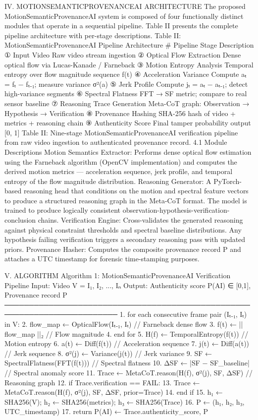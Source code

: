 IV.  MOTIONSEMANTICPROVENANCEAI ARCHITECTURE
The proposed MotionSemanticProvenanceAI system is composed of four functionally distinct modules that operate in a sequential pipeline. Table II presents the complete pipeline architecture with per-stage descriptions.
Table II: MotionSemanticProvenanceAI Pipeline Architecture
#	Pipeline Stage	Description
①	Input Video	Raw video stream ingestion
②	Optical Flow Extraction	Dense optical flow via Lucas-Kanade / Farneback
③	Motion Entropy Analysis	Temporal entropy over flow magnitude sequence f(t)
④	Acceleration Variance	Compute aₜ = fₜ − fₜ₋₁; measure variance σ²(a)
⑤	Jerk Profile	Compute jₜ = aₜ − aₜ₋₁; detect high-variance segments
⑥	Spectral Flatness	FFT → SF metric; compare to real sensor baseline
⑦	Reasoning Trace Generation	Meta-CoT graph: Observation → Hypothesis → Verification
⑧	Provenance Hashing	SHA-256 hash of video + metrics + reasoning chain
⑨	Authenticity Score	Final tamper probability output [0, 1]
Table II: Nine-stage MotionSemanticProvenanceAI verification pipeline from raw video ingestion to authenticated provenance record.
4.1  Module Descriptions
Motion Semantics Extractor: Performs dense optical flow estimation using the Farneback algorithm (OpenCV implementation) and computes the derived motion metrics — acceleration sequence, jerk profile, and temporal entropy of the flow magnitude distribution.
Reasoning Generator: A PyTorch-based reasoning head that conditions on the motion and spectral feature vectors to produce a structured reasoning graph in the Meta-CoT format. The model is trained to produce logically consistent observation-hypothesis-verification-conclusion chains.
Verification Engine: Cross-validates the generated reasoning against physical constraint thresholds and spectral baseline distributions. Any hypothesis failing verification triggers a secondary reasoning pass with updated priors.
Provenance Hasher: Computes the composite provenance record P and attaches a UTC timestamp for forensic time-stamping purposes.

V.  ALGORITHM
Algorithm 1: MotionSemanticProvenanceAI Verification Pipeline
Input:  Video V = {I₁, I₂, ..., Iₙ}
Output: Authenticity score P(AI) ∈ [0,1], Provenance record P
─────────────────────────────────────────────────────────────────────────
1.  for each consecutive frame pair (Iₜ₋₁, Iₜ) in V:
2.      flow_map ← OpticalFlow(Iₜ₋₁, Iₜ)          // Farneback dense flow
3.      f(t) ← || flow_map ||₂                      // Flow magnitude
4.  end for
5.  H(f) ← TemporalEntropy(f(t))                   // Motion entropy
6.  a(t) ← Diff(f(t))                              // Acceleration sequence
7.  j(t) ← Diff(a(t))                              // Jerk sequence
8.  σ²(j) ← Variance(j(t))                         // Jerk variance
9.  SF   ← SpectralFlatness(FFT(f(t)))             // Spectral flatness
10. ΔSF  ← |SF − SF_baseline|                      // Spectral anomaly score
11. Trace ← MetaCoT.reason(H(f), σ²(j), SF, ΔSF)  // Reasoning graph
12. if Trace.verification == FAIL:
13.     Trace ← MetaCoT.reason(H(f), σ²(j), SF, ΔSF, prior=Trace)
14. end if
15. h₁ ← SHA256(V);  h₂ ← SHA256(metrics);  h₃ ← SHA256(Trace)
16. P  ← (h₁, h₂, h₃, UTC_timestamp)
17. return P(AI) ← Trace.authenticity_score, P

